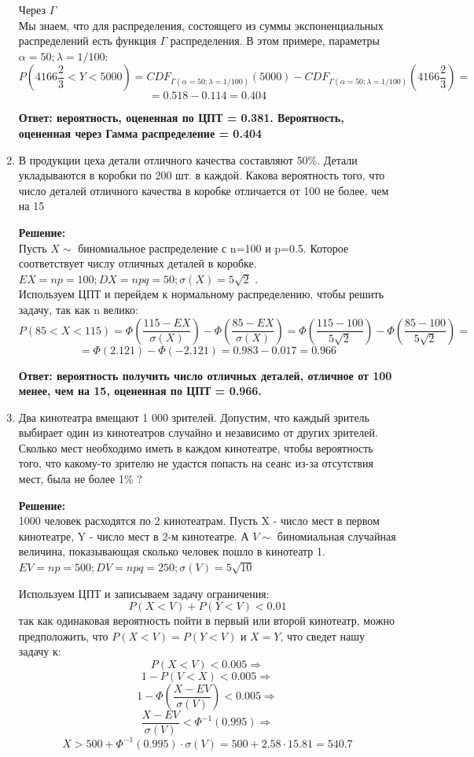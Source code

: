 \documentclass[a4paper,12pt]{article}
\begin{document}
\begin{enumerate}
Через $\Gamma$\\
Мы знаем, что для распределения, состоящего из суммы экспоненциальных распределений есть функция $\Gamma$ распределения. В этом примере, параметры $\alpha = 50; \lambda=1/100$:
$$P(4166 \frac{2}{3} < Y < 5000)=CDF_{\Gamma(\alpha = 50; \lambda=1/100)}(5000)-CDF_{\Gamma(\alpha = 50; \lambda=1/100)}(4166 \frac{2}{3})=$$
$$=0.518-0.114=0.404$$

\textbf{Ответ: вероятность, оцененная по ЦПТ = 0.381. Вероятность, оцененная через Гамма распределение = 0.404} 

\item В продукции цеха детали отличного качества составляют 50\%. Детали укладываются в коробки по 200 шт. в каждой. Какова вероятность того, что число деталей отличного качества в коробке отличается от 100 не более, чем на 15

\textbf{Решение:}\\
Пусть $X\sim$ биномиальное распределение с n=100 и p=0.5. Которое соответствует числу отличных деталей в коробке. $EX=np=100; DX = npq = 50; \sigma(X) = 5\sqrt{2}$ .\\
Используем ЦПТ и перейдем к нормальному распределению, чтобы решить задачу, так как n велико:
$$P(85<X<115)=\Phi(\frac{115-EX}{\sigma (X)})-\Phi(\frac{85-EX}{\sigma (X)})=\Phi(\frac{115-100}{5\sqrt{2}})-\Phi(\frac{85-100}{5\sqrt{2}})=$$
$$=\Phi(2.121)-\Phi(-2.121)=0.983-0.017=0.966$$

\textbf{Ответ: вероятность получить число отличных деталей, отличное от 100 менее, чем на 15, оцененная по ЦПТ = 0.966.} 

\item Два кинотеатра вмещают 1 000 зрителей. Допустим, что каждый зритель выбирает один из кинотеатров случайно и независимо от других зрителей. Сколько мест необходимо иметь в каждом кинотеатре, чтобы вероятность того, что какому-то зрителю не удастся попасть на сеанс из-за отсутствия мест, была не более 1\% ?

\textbf{Решение:}\\
1000 человек расходятся по 2 кинотеатрам. Пусть X - число мест в первом кинотеатре, Y - число мест в 2-м кинотеатре. А $V\sim$ биномиальная случайная величина, показывающая сколько человек пошло в кинотеатр 1.
$EV = np =500; DV = npq = 250; \sigma(V) = 5 \sqrt{10}$

Используем ЦПТ и записываем задачу ограничения:
$$P(X<V) + P(Y<V) < 0.01$$
так как одинаковая вероятность пойти в первый или второй кинотеатр, можно предположить, что $P(X<V)=P(Y<V)$ и $X=Y$, что сведет нашу задачу к:
$$P(X<V)  < 0.005 \Rightarrow$$
$$1- P(V<X)  < 0.005 \Rightarrow$$
$$1- \Phi(\frac{X-EV}{\sigma (V)})  < 0.005 \Rightarrow$$
$$\frac{X-EV}{\sigma (V)}  < \Phi^{-1}(0.995)  \Rightarrow$$
$$X > 500+ \Phi^{-1}(0.995) \cdot \sigma (V) = 500+2.58 \cdot 15.81 = 540.7$$


\end{enumerate}
\end{document}
